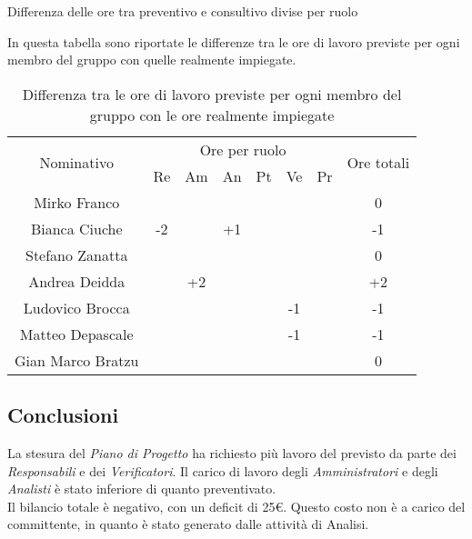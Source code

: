 \begin{flushleft}
\begin{table}[ht]
\begin{center}
			\caption{Differenza delle ore tra preventivo e consultivo divise per ruolo} 
		\end{center}
	\end{table}

    In questa tabella  sono riportate le differenze tra le ore di lavoro previste per ogni membro del gruppo con quelle realmente impiegate.
 
       \begin{table}[ht]
 	\begin{center}
 		\begin{tabularx}{\textwidth}{|c|cccccc|c|}
 			
 			\hline
 			\multirow{2}{*}{Nominativo} & \multicolumn{6}{c|}{Ore per ruolo} & \multirow{2}{*}{Ore totali} \\ \cline{2-7}
 			& Re & Am & An & Pt & Ve & Pr &      \\ \hline
 			\endhead
 			Mirko Franco       &   &    &    &    &  &   & 0    \\ \hline
 			Bianca Ciuche      & -2 &  & +1 &    &  &   & -1       \\ \hline
 			Stefano Zanatta    &   &  &  &  &   &   &    0   \\ \hline
 			Andrea Deidda      &   & +2 &   &   &  &   &  +2  		\\ \hline
 			Ludovico Brocca    &   &  &  &  & -1 &   & -1       \\ \hline
 			Matteo Depascale   &   &  &   &   &  -1 &  & -1  		\\ \hline
 			Gian Marco Bratzu  &   &  &   &   &  &   & 0        \\ \hline
 			
 		\end{tabularx}
 		\caption{Differenza tra le ore di lavoro previste per ogni membro del gruppo con le ore realmente impiegate }
 		\end{center}
	 \end{table}
 
   
    \subsection{Conclusioni}
    La stesura del \textit{Piano di Progetto} ha richiesto più lavoro del previsto da parte dei \textit{Responsabili} e dei \textit{Verificatori}. Il carico di lavoro degli \textit{Amministratori} e degli \textit{Analisti} è stato inferiore di quanto preventivato.\\ Il bilancio totale è negativo, con un deficit di 25\euro. Questo costo non è a carico del committente, in quanto è stato generato dalle attività di Analisi.
    

\end{flushleft}
